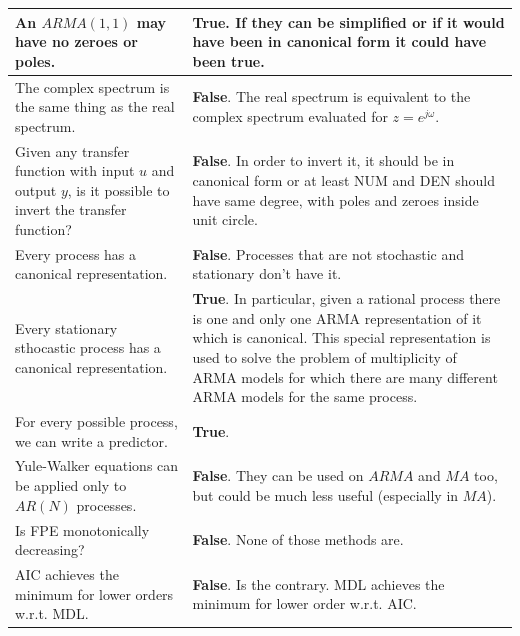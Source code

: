 \documentclass[10pt,a4paper]{article}
\begin{document}
\begin{center}
\begin{tabular}{ | m{200pt} | m{200pt}| }
     \\ \hline
     An $ARMA(1,1)$ may have no zeroes or poles. & \textbf{True}. If they can be simplified or if it would have been in canonical form it could have been true.
     \\ \hline
     The complex spectrum is the same thing as the real spectrum. & \textbf{False}. The real spectrum is equivalent to the complex spectrum evaluated for $z=e^{j\omega}$.
     \\ \hline
     Given any transfer function with input $u$ and output $y$, is it possible to invert the transfer function? & \textbf{False}. In order to invert it, it should be in canonical form or at least NUM and DEN should have same degree, with poles and zeroes inside unit circle.
     \\ \hline
     Every process has a canonical representation. & \textbf{False}. Processes that are not stochastic and stationary don't have it.
     \\ \hline Every stationary sthocastic process has a canonical representation. & \textbf{True}. In particular, given a rational process there is one and only one ARMA representation of it which is canonical. This special representation is used to solve the problem of multiplicity of ARMA models for which there are many different ARMA models for the same process.
     \\ \hline
     For every possible process, we can write a predictor. & \textbf{True}.
     \\ \hline
     Yule-Walker equations can be applied only to $AR(N)$ processes.
     & \textbf{False}. They can be used on $ARMA$ and $MA$ too, but could be much less useful (especially in $MA$).
     \\ \hline
     Is FPE monotonically decreasing? & \textbf{False}. None of those methods are.
     \\ \hline
     AIC achieves the minimum for lower orders w.r.t. MDL. & \textbf{False}. Is the contrary. MDL achieves the minimum for lower order w.r.t. AIC.
     \\ \hline
     \end{tabular}
\end{center}
\pagebreak
\end{document}
